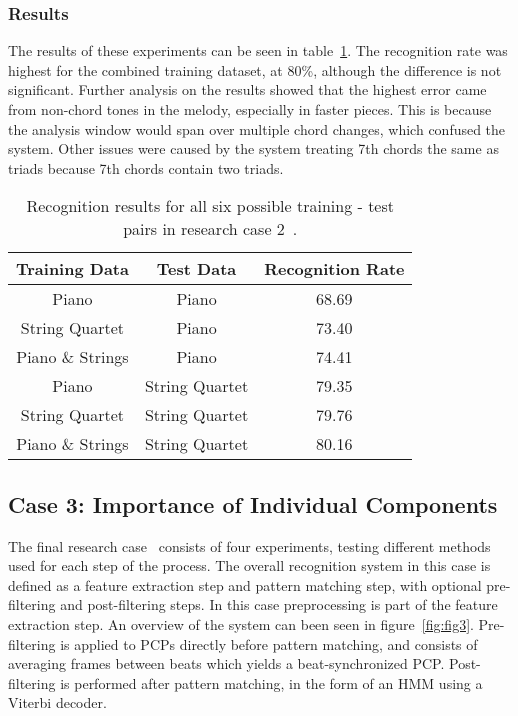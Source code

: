 \documentclass{sig-alternate}
\begin{document}
\subsubsection{Results}

The results of these experiments can be seen in table~\ref{tab:tab5}. The recognition rate was highest for the combined training dataset, at 80\%, although the difference is not significant. Further analysis on the results showed that the highest error came from non-chord tones in the melody, especially in faster pieces. This is because the analysis window would span over multiple chord changes, which confused the system. Other issues were caused by the system treating 7th chords the same as triads because 7th chords contain two triads.

\begin{table}
\centering
\begin{tabular}{|c|c|c|} \hline
\textbf{Training Data} & \textbf{Test Data} & \textbf{Recognition Rate} \\ \hline
Piano & Piano & 68.69 \\ \hline
String Quartet & Piano & 73.40 \\ \hline
Piano \& Strings & Piano & 74.41 \\ \hline
Piano & String Quartet & 79.35 \\ \hline
String Quartet & String Quartet & 79.76 \\ \hline
Piano \& Strings & String Quartet & 80.16 \\ \hline
\end{tabular}
\caption{Recognition results for all six possible training - test pairs in research case 2~\cite{Lee:2006}.}
\label{tab:tab5}
\end{table}

\subsection{Case 3: Importance of Individual Components}

The final research case~\cite{TaeMin:2014} consists of four experiments, testing different methods used for each step of the process. The overall recognition system in this case is defined as a feature extraction step and pattern matching step, with optional pre-filtering and post-filtering steps. In this case preprocessing is part of the feature extraction step. An overview of the system can been seen in figure~\ref{fig:fig3}. Pre-filtering is applied to PCPs directly before pattern matching, and consists of averaging frames between beats which yields a beat-synchronized PCP. Post-filtering is performed after pattern matching, in the form of an HMM using a Viterbi decoder.
\end{document}
